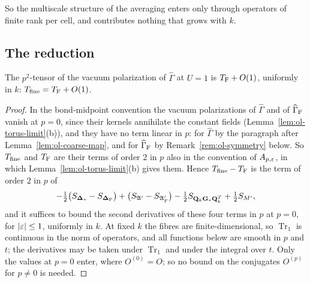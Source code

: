 So the multiscale structure of the averaging enters only through operators of finite rank per cell, and contributes nothing that grows with $k$.

\subsection{The reduction}\label{subsec:ol-vp-trace}

\begin{proposition}\label{prop:ol-reduction}
The $p^2$-tensor of the vacuum polarization of $\widehat\Gamma$ at $U=1$ is $T_{\rm F}+O(1)$, uniformly in $k$: $T_{\rm fine}=T_{\rm F}+O(1)$.
\end{proposition}

\begin{proof}
In the bond-midpoint convention the vacuum polarizations of $\widehat\Gamma$ and of $\widehat\Gamma_{\rm F}$ vanish at $p=0$, since their kernels annihilate the constant fields (Lemma~\ref{lem:ol-torus-limit}(b)), and they have no term linear in $p$: for $\widehat\Gamma$ by the paragraph after Lemma~\ref{lem:ol-coarse-map}, and for $\widehat\Gamma_{\rm F}$ by Remark~\ref{rem:ol-symmetry} below. So $T_{\rm fine}$ and $T_{\rm F}$ are their terms of order $2$ in $p$ also in the convention of $A_{p,\varepsilon}$, in which Lemma~\ref{lem:ol-torus-limit}(b) gives them. Hence $T_{\rm fine}-T_{\rm F}$ is the term of order $2$ in $p$ of
\[
-\tfrac12\big(S_{\boldsymbol{\Delta}_*}-S_{\boldsymbol{\Delta}_{\rm F}}\big)+\big(S_{\mathfrak A'}-S_{\mathfrak A'_{\rm F}}\big)-\tfrac12S_{\mathbf Q_k\mathbf G_*\mathbf Q_k^T}+\tfrac12S_{M'},
\]
and it suffices to bound the second derivatives of these four terms in $p$ at $p=0$, for $|\varepsilon|\le1$, uniformly in $k$. At fixed $k$ the fibres are finite-dimensional, so $\operatorname{Tr}_1$ is continuous in the norm of operators, and all functions below are smooth in $p$ and $t$; the derivatives may be taken under $\operatorname{Tr}_1$ and under the integral over $t$. Only the values at $p=0$ enter, where $O^{(0)}=O$; so no bound on the conjugates $O^{(p)}$ for $p\ne0$ is needed.


\end{proof}
